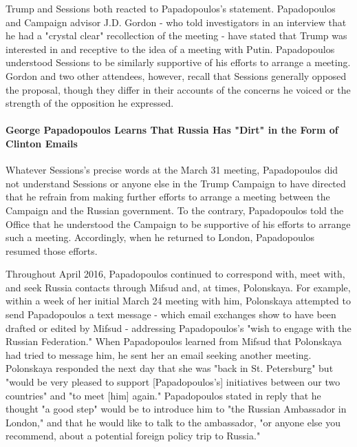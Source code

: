Trump and Sessions both reacted to Papadopoulos's statement. Papadopoulos and Campaign advisor J.D. Gordon - who told investigators in an interview that he had a "crystal clear" recollection of the meeting - have stated that Trump was interested in and receptive to the idea of a meeting with Putin.%
Papadopoulos understood Sessions to be similarly supportive of his efforts to arrange a meeting.%
Gordon and two other attendees, however, recall that Sessions generally opposed the proposal, though they differ in their accounts of the concerns he voiced or the strength of the opposition he expressed.%

\paragraph{George Papadopoulos Learns That Russia Has "Dirt" in the Form of Clinton Emails}

Whatever Sessions's precise words at the March 31 meeting, Papadopoulos did not understand Sessions or anyone else in the Trump Campaign to have directed that he refrain from making further efforts to arrange a meeting between the Campaign and the Russian government.
To the contrary, Papadopoulos told the Office that he understood the Campaign to be supportive of his efforts to arrange such a meeting.%
Accordingly, when he returned to London, Papadopoulos resumed those efforts.%

Throughout April 2016, Papadopoulos continued to correspond with, meet with, and seek Russia contacts through Mifsud and, at times, Polonskaya.%
For example, within a week of her initial March 24 meeting with him, Polonskaya attempted to send Papadopoulos a text message - which email exchanges show to have been drafted or edited by Mifsud - addressing Papadopoulos's "wish to engage with the Russian Federation."%
When Papadopoulos learned from Mifsud that Polonskaya had tried to message him, he sent her an email seeking another meeting.%
Polonskaya responded the next day that she was "back in St. Petersburg" but "would be very pleased to support [Papadopoulos's] initiatives between our two countries" and "to meet [him] again."%
Papadopoulos stated in reply that he thought "a good step" would be to introduce him to "the Russian Ambassador in London," and that he would like to talk to the ambassador, "or anyone else you recommend, about a potential foreign policy trip to Russia."%

